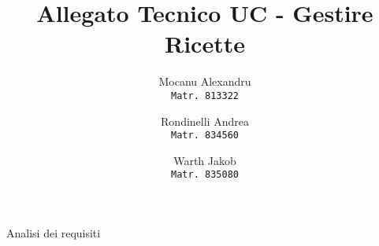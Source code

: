 \documentclass[14pt]{extarticle}
\title{Allegato Tecnico UC - Gestire Ricette}
\author{
  Mocanu Alexandru\\
  \texttt{Matr. 813322}
  \and
  Rondinelli Andrea\\
  \texttt{Matr. 834560}
  \and
  Warth Jakob\\
  \texttt{Matr. 835080}
}
\date{}
\begin{document}
\maketitle
\centering
\vspace{\fill}
\Huge{Analisi dei requisiti}
\end{document}
